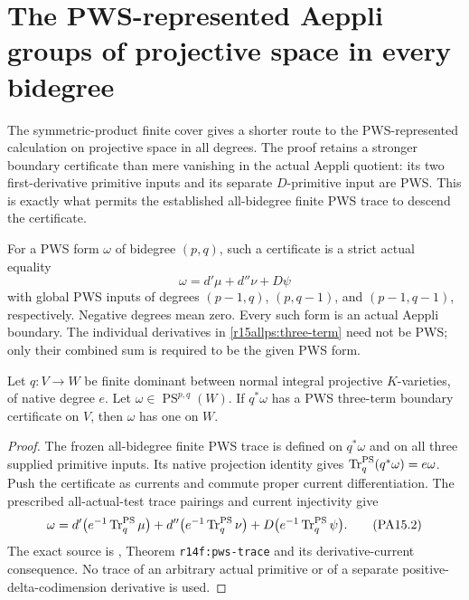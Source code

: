 \section{The PWS-represented Aeppli groups of projective space in every bidegree}
\label{r15allps:section}

The symmetric-product finite cover gives a shorter route to the
PWS-represented calculation on projective space in all degrees.
The proof retains a stronger boundary certificate than mere
vanishing in the actual Aeppli quotient: its two first-derivative
primitive inputs and its separate $D$-primitive input are PWS.
This is exactly what permits the established all-bidegree finite
PWS trace to descend the certificate.

\begin{definition}
\label{r15allps:certificate}
For a PWS form $\omega$ of bidegree $(p,q)$, such a certificate
is a strict actual equality
\[
                 \omega=d'\mu+d''\nu+D\psi
\tag{PA15.1}\label{r15allps:three-term}
\]
with global PWS inputs of degrees
$(p-1,q)$, $(p,q-1)$, and $(p-1,q-1)$, respectively.
Negative degrees mean zero. Every such form is an actual Aeppli
boundary. The individual derivatives in
\eqref{r15allps:three-term} need not be PWS; only their combined
sum is required to be the given PWS form.
\end{definition}

\begin{lemma}
\label{r15allps:finite}
Let $q:V\to W$ be finite dominant between normal integral
projective $K$-varieties, of native degree $e$.
Let $\omega\in\operatorname{PS}^{p,q}(W)$.
If $q^*\omega$ has a PWS three-term boundary certificate
on $V$, then $\omega$ has one on $W$.
\end{lemma}

\begin{proof}
The frozen all-bidegree finite PWS trace is defined on
$q^*\omega$ and on all three supplied primitive inputs.
Its native projection identity gives
$\operatorname{Tr}^{\rm PS}_q(q^*\omega)=e\omega$.
Push the certificate as currents and commute proper current
differentiation. The prescribed all-actual-test trace pairings
and current injectivity give
\[
 \omega
 =d'\bigl(e^{-1}\operatorname{Tr}^{\rm PS}_q\mu\bigr)
  +d''\bigl(e^{-1}\operatorname{Tr}^{\rm PS}_q\nu\bigr)
  +D\bigl(e^{-1}\operatorname{Tr}^{\rm PS}_q\psi\bigr).
\tag{PA15.2}\label{r15allps:trace-certificate}
\]
The exact source is
,
Theorem \texttt{r14f:pws-trace} and its derivative-current
consequence. No trace of an arbitrary actual primitive or
of a separate positive-delta-codimension derivative is used.
\end{proof}

